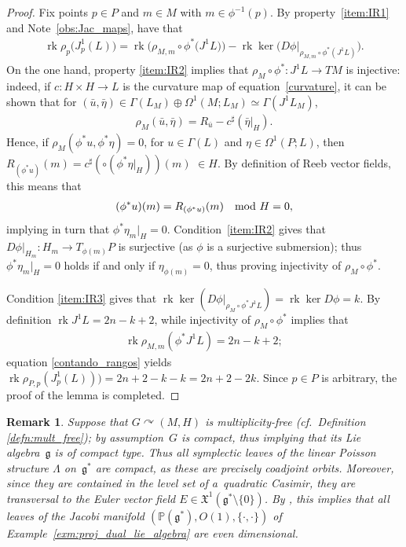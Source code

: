 \documentclass[10pt,a4paper]{amsart}
\numberwithin{equation}{section}
\newtheorem{Remark}[Theorem]{Remark} }
\newcommand{\X}{\ensuremath{\mathfrak{X}}}
\newcommand{\rank}{\operatorname{rk}} %
\newcommand{\CM}{(M,H)} %
\begin{document}
\begin{proof} Fix points $p \in P$ and $m \in M$ with $m \in \phi^{-1}(p)$. By property~\ref{item:IR1} and Note~\ref{obs:Jac_maps}, have that
\begin{gather}\label{contando_rangos}
\rank \rho_{p}\big(J_p^1(L)\big)=\rank \big(\rho_{M,m} \circ \phi^*\big(J^1L\big)\big) -\rank\ker \big(D\phi|_{\rho_{M,m}\circ\phi^*(J^1L)}\big).
\end{gather}
On the one hand, property \ref{item:IR2} implies that $\rho_M\circ\phi^* \colon J^1L \to T M$ is injective: indeed, if $c \colon H \times H \to L$ is the curvature map of equation~\eqref{curvature}, it can be shown that for $(\bar u,\bar\eta)\in\Gamma(L_M)\oplus \Omega^1(M;L_M)\simeq \Gamma(J^1L_M)$,
 \begin{gather*}
 \rho_M(\bar u,\bar\eta)=R_{\bar u}-c^\sharp(\bar\eta|_H).
 \end{gather*}
Hence, if $\rho_M(\phi^*u,\phi^*\eta)=0$, for $u\in\Gamma(L)$ and $\eta\in\Omega^1(P;L)$, then $R_{(\phi^*u)}(m)=c^\sharp(\circ(\phi^*\eta|_H))(m)$ $\in H$. By def\/inition of Reeb vector f\/ields, this means that
\begin{gather*}
 (\phi^*u)(m)=R_{(\phi^*u)}(m)\quad {\rm mod} \ H=0,
\end{gather*}
implying in turn that $\phi^*\eta_m|_H=0$. Condition~\ref{item:IR2} gives that $D\phi|_{H_m}\colon H_m\to T_{\phi(m)}P$ is surjective (as $\phi$ is a surjective submersion); thus $\phi^*\eta_m|_H=0$ holds if and only if $\eta_{\phi(m)}=0$, thus proving injectivity of $\rho_M \circ \phi^*$.

Condition \ref{item:IR3} gives that $\rank\ker (D\phi|_{\rho_M\circ\phi^*J^1L})=\rank \ker D\phi=k$. By def\/inition $\rank J^1L=2n-k+2$, while injectivity of $\rho_M \circ \phi^*$ implies that
\begin{gather*}
 \rank \rho_{M,m}(\phi^* J^1L) = 2n-k+2;
\end{gather*}
equation \eqref{contando_rangos} yields $\rank \rho_{P,p}(J_p^1(L)))=2n+2-k - k = 2n+2-2k$. Since $p \in P$ is arbitrary, the proof of the lemma is completed.
\end{proof}

\begin{Remark}\label{rk:mult_free}
Suppose that $G \curvearrowright \CM$ is multiplicity-free (cf.\ Def\/inition \ref{defn:mult_free}); by assumption~$G$ is compact, thus implying that its Lie algebra~$\mathfrak{g}$ is of compact type. Thus all symplectic leaves of the linear Poisson structure $\Lambda$ on~$\mathfrak{g}^*$ are compact, as these are precisely coadjoint orbits. Moreover, since they are contained in the level set of a~quadratic Casimir, they are transversal to the Euler vector f\/ield $E \in \X^1(\mathfrak{g}^* \setminus \{0\})$. By \cite[Remarque~2.6]{Dazord-Lich-Marle91}, this implies that all leaves of the Jacobi manifold $\left(\mathbb{P}(\mathfrak{g}^*), O(1), \{\cdot,\cdot\}\right)$ of Example~\ref{exm:proj_dual_lie_algebra} are even dimensional.
\end{Remark}
\end{document}
